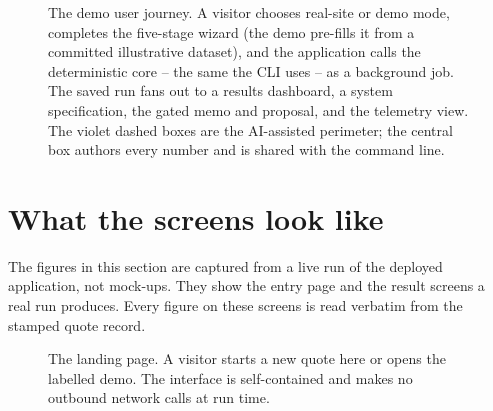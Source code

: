 \begin{figure}[H]
{}
\caption{The demo user journey. A visitor chooses real-site or demo mode, completes the five-stage wizard (the demo pre-fills it from a committed illustrative dataset), and the application calls the deterministic core -- the same  the CLI uses -- as a background job. The saved run fans out to a results dashboard, a system specification, the gated memo and proposal, and the telemetry view. The violet dashed boxes are the AI-assisted perimeter; the central box authors every number and is shared with the command line.}
\label{fig:app-journey}
\end{figure}

\section{What the screens look like}

The figures in this section are captured from a live run of the deployed application, not mock-ups. They show the entry page and the result screens a real run produces. Every figure on these screens is read verbatim from the stamped quote record.

\begin{figure}[H]
\centering
{}
\caption{The landing page. A visitor starts a new quote here or opens the labelled demo. The interface is self-contained and makes no outbound network calls at run time.}
\label{fig:app-landing}
\end{figure}

